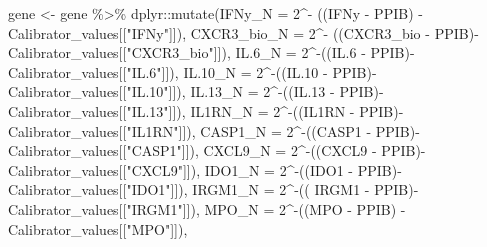 \documentclass[
]{article}
\newenvironment{Shaded}{\begin{snugshade}}{\end{snugshade}}
\newcommand{\AttributeTok}[1]{\textcolor[rgb]{0.77,0.63,0.00}{#1}}
\newcommand{\DecValTok}[1]{\textcolor[rgb]{0.00,0.00,0.81}{#1}}
\newcommand{\FloatTok}[1]{\textcolor[rgb]{0.00,0.00,0.81}{#1}}
\newcommand{\FunctionTok}[1]{\textcolor[rgb]{0.00,0.00,0.00}{#1}}
\newcommand{\NormalTok}[1]{#1}
\newcommand{\OtherTok}[1]{\textcolor[rgb]{0.56,0.35,0.01}{#1}}
\newcommand{\SpecialCharTok}[1]{\textcolor[rgb]{0.00,0.00,0.00}{#1}}
\newcommand{\StringTok}[1]{\textcolor[rgb]{0.31,0.60,0.02}{#1}}
\begin{document}
\begin{Shaded}
\begin{Highlighting}[]
\NormalTok{gene }\OtherTok{\textless{}{-}}\NormalTok{ gene }\SpecialCharTok{\%\textgreater{}\%}
\NormalTok{  dplyr}\SpecialCharTok{::}\FunctionTok{mutate}\NormalTok{(}\AttributeTok{IFNy\_N =} \DecValTok{2}\SpecialCharTok{\^{}{-}}\NormalTok{ ((IFNy }\SpecialCharTok{{-}}\NormalTok{ PPIB) }\SpecialCharTok{{-}}\NormalTok{ Calibrator\_values[[}\StringTok{"IFNy"}\NormalTok{]]),}
                \AttributeTok{CXCR3\_bio\_N  =} \DecValTok{2}\SpecialCharTok{\^{}{-}}\NormalTok{ ((CXCR3\_bio }\SpecialCharTok{{-}}\NormalTok{ PPIB)}\SpecialCharTok{{-}}\NormalTok{ Calibrator\_values[[}\StringTok{"CXCR3\_bio"}\NormalTok{]]),}
                \AttributeTok{IL.6\_N =} \DecValTok{2}\SpecialCharTok{\^{}{-}}\NormalTok{((IL}\FloatTok{.6} \SpecialCharTok{{-}}\NormalTok{ PPIB)}\SpecialCharTok{{-}}\NormalTok{ Calibrator\_values[[}\StringTok{"IL.6"}\NormalTok{]]),}
                \AttributeTok{IL.10\_N =} \DecValTok{2}\SpecialCharTok{\^{}{-}}\NormalTok{((IL}\FloatTok{.10} \SpecialCharTok{{-}}\NormalTok{ PPIB)}\SpecialCharTok{{-}}\NormalTok{ Calibrator\_values[[}\StringTok{"IL.10"}\NormalTok{]]),}
                \AttributeTok{IL.13\_N =} \DecValTok{2}\SpecialCharTok{\^{}{-}}\NormalTok{((IL}\FloatTok{.13} \SpecialCharTok{{-}}\NormalTok{ PPIB)}\SpecialCharTok{{-}}\NormalTok{ Calibrator\_values[[}\StringTok{"IL.13"}\NormalTok{]]),}
                \AttributeTok{IL1RN\_N =} \DecValTok{2}\SpecialCharTok{\^{}{-}}\NormalTok{((IL1RN }\SpecialCharTok{{-}}\NormalTok{ PPIB)}\SpecialCharTok{{-}}\NormalTok{ Calibrator\_values[[}\StringTok{"IL1RN"}\NormalTok{]]),}
                \AttributeTok{CASP1\_N =} \DecValTok{2}\SpecialCharTok{\^{}{-}}\NormalTok{((CASP1 }\SpecialCharTok{{-}}\NormalTok{ PPIB)}\SpecialCharTok{{-}}\NormalTok{ Calibrator\_values[[}\StringTok{"CASP1"}\NormalTok{]]),}
                \AttributeTok{CXCL9\_N  =} \DecValTok{2}\SpecialCharTok{\^{}{-}}\NormalTok{((CXCL9 }\SpecialCharTok{{-}}\NormalTok{ PPIB)}\SpecialCharTok{{-}}\NormalTok{ Calibrator\_values[[}\StringTok{"CXCL9"}\NormalTok{]]),}
                \AttributeTok{IDO1\_N =} \DecValTok{2}\SpecialCharTok{\^{}{-}}\NormalTok{((IDO1 }\SpecialCharTok{{-}}\NormalTok{ PPIB)}\SpecialCharTok{{-}}\NormalTok{ Calibrator\_values[[}\StringTok{"IDO1"}\NormalTok{]]),}
                \AttributeTok{IRGM1\_N =} \DecValTok{2}\SpecialCharTok{\^{}{-}}\NormalTok{(( IRGM1 }\SpecialCharTok{{-}}\NormalTok{ PPIB)}\SpecialCharTok{{-}}\NormalTok{ Calibrator\_values[[}\StringTok{"IRGM1"}\NormalTok{]]),}
                \AttributeTok{MPO\_N  =}  \DecValTok{2}\SpecialCharTok{\^{}{-}}\NormalTok{((MPO }\SpecialCharTok{{-}}\NormalTok{ PPIB) }\SpecialCharTok{{-}}\NormalTok{ Calibrator\_values[[}\StringTok{"MPO"}\NormalTok{]]),}

\end{Highlighting}
\end{Shaded}
\end{document}
